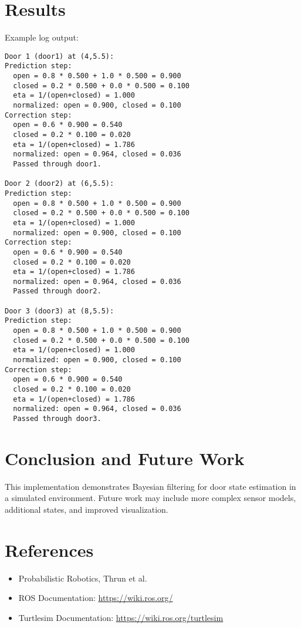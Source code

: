 \documentclass[12pt]{article}
\begin{document}
\section{Results}
Example log output:
\begin{verbatim}
Door 1 (door1) at (4,5.5):
Prediction step:
  open = 0.8 * 0.500 + 1.0 * 0.500 = 0.900
  closed = 0.2 * 0.500 + 0.0 * 0.500 = 0.100
  eta = 1/(open+closed) = 1.000
  normalized: open = 0.900, closed = 0.100
Correction step:
  open = 0.6 * 0.900 = 0.540
  closed = 0.2 * 0.100 = 0.020
  eta = 1/(open+closed) = 1.786
  normalized: open = 0.964, closed = 0.036
  Passed through door1.

Door 2 (door2) at (6,5.5):
Prediction step:
  open = 0.8 * 0.500 + 1.0 * 0.500 = 0.900
  closed = 0.2 * 0.500 + 0.0 * 0.500 = 0.100
  eta = 1/(open+closed) = 1.000
  normalized: open = 0.900, closed = 0.100
Correction step:
  open = 0.6 * 0.900 = 0.540
  closed = 0.2 * 0.100 = 0.020
  eta = 1/(open+closed) = 1.786
  normalized: open = 0.964, closed = 0.036
  Passed through door2.

Door 3 (door3) at (8,5.5):
Prediction step:
  open = 0.8 * 0.500 + 1.0 * 0.500 = 0.900
  closed = 0.2 * 0.500 + 0.0 * 0.500 = 0.100
  eta = 1/(open+closed) = 1.000
  normalized: open = 0.900, closed = 0.100
Correction step:
  open = 0.6 * 0.900 = 0.540
  closed = 0.2 * 0.100 = 0.020
  eta = 1/(open+closed) = 1.786
  normalized: open = 0.964, closed = 0.036
  Passed through door3.
\end{verbatim}
\section{Conclusion and Future Work}
This implementation demonstrates Bayesian filtering for door state estimation in a simulated environment. Future work may include more complex sensor models, additional states, and improved visualization.
\section{References}
\begin{itemize}
  \item Probabilistic Robotics, Thrun et al.
  \item ROS Documentation: \url{https://wiki.ros.org/}
  \item Turtlesim Documentation: \url{https://wiki.ros.org/turtlesim}
\end{itemize}
\end{document}
